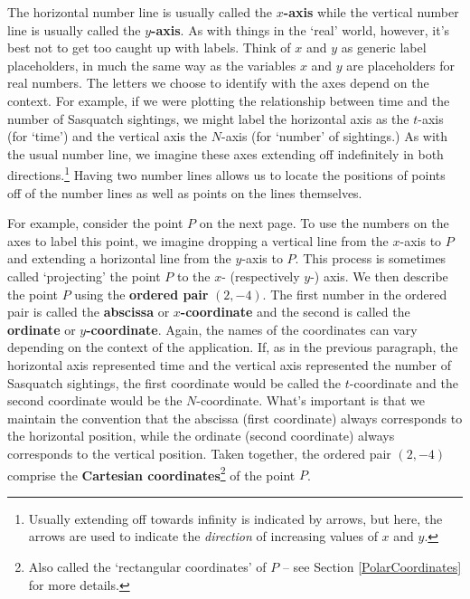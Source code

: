\documentclass{ximera}
\begin{document}
The horizontal number line is usually called the  \textbf{\boldmath $x$-axis} while the vertical number line is usually called the  \textbf{\boldmath $y$-axis}. As with things in the `real' world, however, it's best not to get too caught up with labels. Think of $x$ and $y$ as generic label placeholders, in much the same way as the variables $x$ and $y$ are placeholders for real numbers.  The letters we choose to identify with the axes depend on the context.  For example, if we were plotting the relationship between time and the number of Sasquatch sightings, we might label the horizontal axis as the $t$-axis (for `time') and the vertical axis the $N$-axis (for `number' of sightings.)  As with the usual number line, we imagine these axes extending off indefinitely in both directions.\footnote{Usually extending off  towards infinity is indicated by arrows, but here, the arrows are used to indicate the \textit{direction} of increasing values of $x$ and $y$.}
  Having two number lines allows us to locate the positions of points off of the number lines as well as points on the lines themselves.  

 

For example, consider the point $P$ on the next page.  To use the numbers on the axes to label this point, we imagine dropping a vertical line from the $x$-axis to $P$ and extending a horizontal line from the $y$-axis to $P$.  This process is sometimes called `projecting' the point $P$ to the $x$- (respectively $y$-) axis.  We then describe the point $P$ using the  \textbf{ordered pair} $(2,-4)$.  The first number in the ordered pair is called the  \textbf{abscissa} or  \textbf{\boldmath $x$-coordinate} and the second is called the  \textbf{ordinate} or  \textbf{\boldmath $y$-coordinate}.  Again, the names of the coordinates can vary depending on the context of the application. If, as in the previous paragraph, the horizontal axis represented time and the vertical axis represented the number of Sasquatch sightings, the first coordinate would be called the $t$-coordinate and the second coordinate would be the $N$-coordinate. What's important is that we maintain the convention that the abscissa (first coordinate) always corresponds to the horizontal position, while the ordinate (second coordinate) always corresponds to the vertical position.  Taken together, the ordered pair $(2,-4)$ comprise the \textbf{Cartesian coordinates}\footnote{Also called the `rectangular coordinates' of $P$ -- see Section \ref{PolarCoordinates} for more details.} of the point $P$. 
\end{document}
